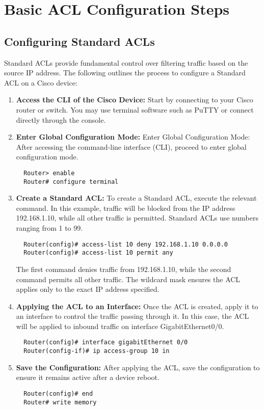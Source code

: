 \documentclass[11pt,a4paper]{article}
\begin{document}
\section*{Basic ACL Configuration Steps}
    \subsection*{Configuring Standard ACLs}
    Standard ACLs provide fundamental control over filtering traffic based on the source IP address. The following outlines the process to configure a Standard ACL on a Cisco device:
  
        \begin{enumerate}
            \item \textbf{Access the CLI of the Cisco Device:} Start by connecting to your Cisco router or switch. You may use terminal software such as PuTTY or connect directly through the console.

            \item \textbf{Enter Global Configuration Mode:} Enter Global Configuration Mode: After accessing the command-line interface (CLI), proceed to enter global configuration mode.

\begin{lstlisting}
  Router> enable
  Router# configure terminal
\end{lstlisting}

            \item \textbf{Create a Standard ACL:} To create a Standard ACL, execute the relevant command. In this example, traffic will be blocked from the IP address 192.168.1.10, while all other traffic is permitted. Standard ACLs use numbers ranging from 1 to 99.
\begin{lstlisting}
  Router(config)# access-list 10 deny 192.168.1.10 0.0.0.0
  Router(config)# access-list 10 permit any
\end{lstlisting}
            The first command denies traffic from 192.168.1.10, while the second command permits all other traffic. The wildcard mask ensures the ACL applies only to the exact IP address specified.

            \item \textbf{Applying the ACL to an Interface:} Once the ACL is created, apply it to an interface to control the traffic passing through it. In this case, the ACL will be applied to inbound traffic on interface GigabitEthernet0/0.
\begin{lstlisting}
  Router(config)# interface gigabitEthernet 0/0
  Router(config-if)# ip access-group 10 in
\end{lstlisting}
            \item \textbf{Save the Configuration:} After applying the ACL, save the configuration to ensure it remains active after a device reboot.
\begin{lstlisting}
  Router(config)# end
  Router# write memory
\end{lstlisting}
        \end{enumerate}
    
\end{document}
